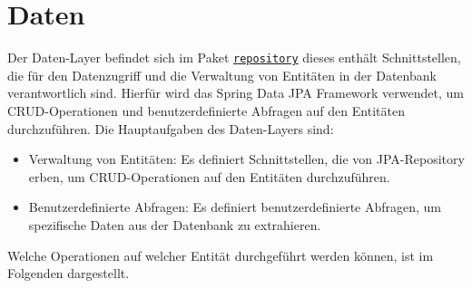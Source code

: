 
\chapter{Daten}
\label{ch:data}

Der Daten-Layer befindet sich im Paket \hyperref[edu.kit.hci.soli.repository]{\texttt{repository}} dieses enthält Schnittstellen, die für den Datenzugriff und die Verwaltung von Entitäten in der Datenbank verantwortlich sind.
Hierfür wird das Spring Data JPA Framework verwendet, um \gls{CRUD}-Operationen und benutzerdefinierte Abfragen auf den Entitäten durchzuführen.
Die Hauptaufgaben des Daten-Layers sind:

\begin{itemize}
    \item Verwaltung von Entitäten: Es definiert Schnittstellen, die von JPA-Repository erben, um CRUD-Operationen auf den Entitäten durchzuführen.
    \item Benutzerdefinierte Abfragen: Es definiert benutzerdefinierte Abfragen, um spezifische Daten aus der Datenbank zu extrahieren.
\end{itemize}

Welche Operationen auf welcher Entität durchgeführt werden können, ist im Folgenden dargestellt.

